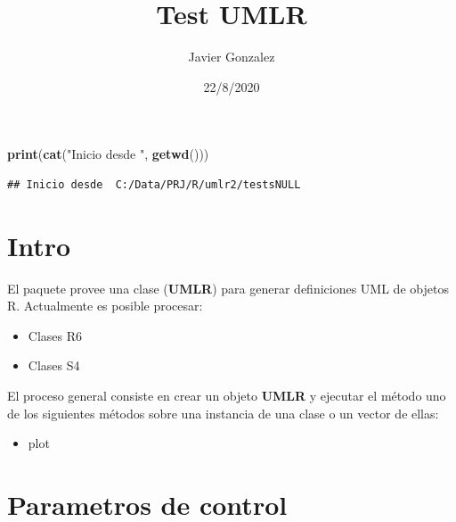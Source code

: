 \documentclass[
]{article}
\title{Test UMLR}
\author{Javier Gonzalez}
\date{22/8/2020}
\newenvironment{Shaded}{\begin{snugshade}}{\end{snugshade}}
\newcommand{\CommentTok}[1]{\textcolor[rgb]{0.56,0.35,0.01}{\textit{#1}}}
\newcommand{\KeywordTok}[1]{\textcolor[rgb]{0.13,0.29,0.53}{\textbf{#1}}}
\newcommand{\NormalTok}[1]{#1}
\newcommand{\StringTok}[1]{\textcolor[rgb]{0.31,0.60,0.02}{#1}}
\providecommand{\tightlist}{%
  \setlength{\itemsep}{0pt}\setlength{\parskip}{0pt}}
\begin{document}
\maketitle

\begin{Shaded}
\begin{Highlighting}[]
\KeywordTok{print}\NormalTok{(}\KeywordTok{cat}\NormalTok{(}\StringTok{"Inicio desde "}\NormalTok{, }\KeywordTok{getwd}\NormalTok{()))}
\end{Highlighting}
\end{Shaded}

\begin{verbatim}
## Inicio desde  C:/Data/PRJ/R/umlr2/testsNULL
\end{verbatim}

\begin{Shaded}
\end{Shaded}

\hypertarget{intro}{%
\section{Intro}\label{intro}}

El paquete provee una clase (\textbf{UMLR}) para generar definiciones
UML de objetos R. Actualmente es posible procesar:

\begin{itemize}
\tightlist
\item
  Clases R6
\item
  Clases S4
\end{itemize}

El proceso general consiste en crear un objeto \textbf{UMLR} y ejecutar
el método uno de los siguientes métodos sobre una instancia de una clase
o un vector de ellas:

\begin{itemize}
\tightlist
\item
  plot
\end{itemize}

\hypertarget{parametros-de-control}{%
\section{Parametros de control}\label{parametros-de-control}}
\end{document}
